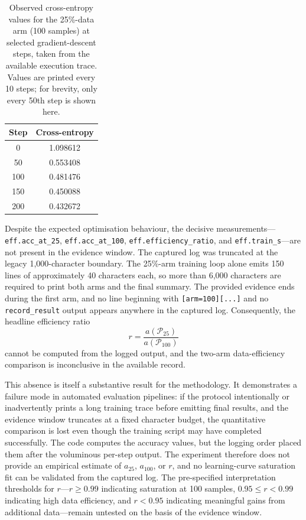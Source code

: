 \documentclass{article}
\begin{document}
\begin{table}[h]
\centering
\caption{Observed cross-entropy values for the 25\%-data arm (100 samples) at selected gradient-descent steps, taken from the available execution trace. Values are printed every 10 steps; for brevity, only every 50th step is shown here.}
\label{tab:observed-loss}
\begin{tabular}{cc}
\toprule
\textbf{Step} & \textbf{Cross-entropy} \\
\midrule
0    & 1.098612 \\
50   & 0.553408 \\
100  & 0.481476 \\
150  & 0.450088 \\
200  & 0.432672 \\
\bottomrule
\end{tabular}
\end{table}

Despite the expected optimisation behaviour, the decisive measurements---\texttt{eff.acc\_at\_25}, \texttt{eff.acc\_at\_100}, \texttt{eff.efficiency\_ratio}, and \texttt{eff.train\_s}---are not present in the evidence window. The captured log was truncated at the legacy 1{,}000-character boundary. The 25\%-arm training loop alone emits 150 lines of approximately 40 characters each, so more than 6{,}000 characters are required to print both arms and the final summary. The provided evidence ends during the first arm, and no line beginning with \texttt{[arm=100][...]} and no \texttt{record\_result} output appears anywhere in the captured log. Consequently, the headline efficiency ratio
\begin{equation}
r = \frac{a(\mathcal{P}_{25})}{a(\mathcal{P}_{100})}
\end{equation}
cannot be computed from the logged output, and the two-arm data-efficiency comparison is inconclusive in the available record.

This absence is itself a substantive result for the methodology. It demonstrates a failure mode in automated evaluation pipelines: if the protocol intentionally or inadvertently prints a long training trace before emitting final results, and the evidence window truncates at a fixed character budget, the quantitative comparison is lost even though the training script may have completed successfully. The code computes the accuracy values, but the logging order placed them after the voluminous per-step output. The experiment therefore does not provide an empirical estimate of \(a_{25}\), \(a_{100}\), or \(r\), and no learning-curve saturation fit can be validated from the captured log. The pre-specified interpretation thresholds for \(r\)---\(r \ge 0.99\) indicating saturation at 100 samples, \(0.95 \le r < 0.99\) indicating high data efficiency, and \(r < 0.95\) indicating meaningful gains from additional data---remain untested on the basis of the evidence window.
\end{document}
